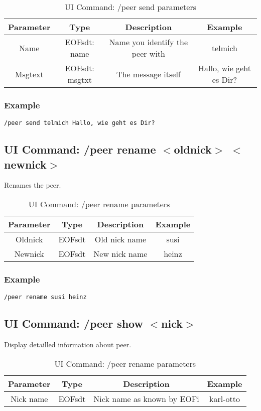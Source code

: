 %
\begin{longtable}{|c|c|c|c|}
\caption{UI Command: /peer send parameters}\\
\hline
\textbf{Parameter} & \textbf{Type} & \textbf{Description} & \textbf{Example}\\
\hline
Name & EOFsdt: name & Name you identify the peer with & telmich\\
\hline
Msgtext & EOFsdt: msgtxt & The message itself & Hallo, wie geht es Dir?\\
\hline
\end{longtable}

\subsubsection{Example}
\begin{verbatim}
/peer send telmich Hallo, wie geht es Dir?
\end{verbatim}
\subsection{UI Command: /peer rename $<$oldnick$>$ $<$newnick$>$}
Renames the peer.
%
\begin{longtable}{|c|c|c|c|}
\caption{UI Command: /peer rename parameters}\\
\hline
\textbf{Parameter} & \textbf{Type} & \textbf{Description} & \textbf{Example}\\
\hline
Oldnick & EOFsdt & Old nick name & susi\\
\hline
Newnick & EOFsdt & New nick name & heinz\\
\hline
\end{longtable}

\subsubsection{Example}
\begin{verbatim}
/peer rename susi heinz
\end{verbatim}
\subsection{UI Command: /peer show $<$nick$>$}
Display detailled information about peer.
%
\begin{longtable}{|c|c|c|c|}
\caption{UI Command: /peer rename parameters}\\
\hline
\textbf{Parameter} & \textbf{Type} & \textbf{Description} & \textbf{Example}\\
\hline
Nick name & EOFsdt & Nick name as known by EOFi & karl-otto\\
\hline
\end{longtable}

